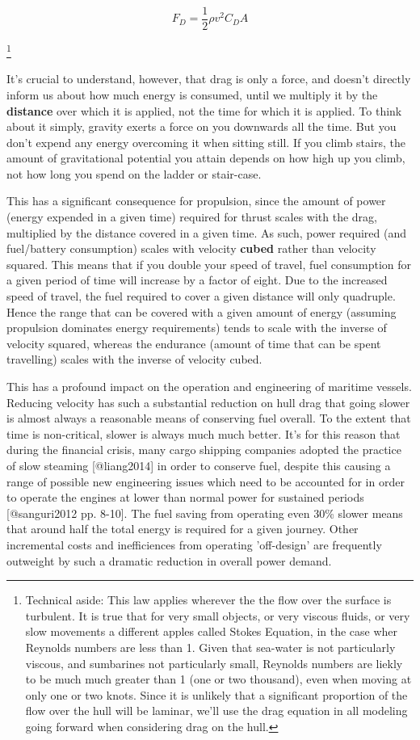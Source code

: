 \documentclass{article}\usepackage[]{graphicx}\usepackage[]{color}
\begin{document}
\begin{equation}
\label{eq:1}
F_D = \frac{1}{2}\rho v^2C_DA
\end{equation}

\footnote{Technical aside: This law applies wherever the the flow over the surface is turbulent. It is true that for very small objects, or very viscous fluids, or very slow movements a different apples called Stokes Equation, in the case wher Reynolds numbers are less than 1.  Given that sea-water is not particularly viscous, and sumbarines not particularly small, Reynolds numbers are liekly to be much much greater than 1 (one or two thousand), even when moving at only one or two knots.  Since it is unlikely that a significant proportion of the flow over the hull will be laminar, we'll use the drag equation in all modeling going forward when considering drag on the hull.}


It's crucial to understand, however, that drag is only a force, and doesn't directly inform us about how much energy is consumed, until we multiply it by the \textbf{distance} over which it is applied, not the time for which it is applied.  To think about it simply, gravity exerts a force on you downwards all the time.  But you don't expend any energy overcoming it when sitting still.  If you climb stairs, the amount of gravitational potential you attain depends on how high up you climb, not how long you spend on the ladder or stair-case.

This has a significant consequence for propulsion, since the amount of power (energy expended in a given time) required for thrust scales with the drag, multiplied by the distance covered in a given time.  As such, power required (and fuel/battery consumption) scales with velocity \textbf{cubed} rather than velocity squared.  This means that if you double your speed of travel, fuel consumption for a given period of time will increase by a factor of eight.  Due to the increased speed of travel, the fuel required to cover a given distance will only quadruple.  Hence the range that can be covered with a given amount of energy (assuming propulsion dominates energy requirements) tends to scale with the inverse of velocity squared, whereas the endurance (amount of time that can be spent travelling) scales with the inverse of velocity cubed.

This has a profound impact on the operation and engineering of maritime vessels.  Reducing velocity has such a substantial reduction on hull drag that going slower is almost always a reasonable means of conserving fuel overall.  To the extent that time is non-critical, slower is always much much better.  It's for this reason that during the financial crisis, many cargo shipping companies adopted the practice of slow steaming [@liang2014] in order to conserve fuel, despite this causing a range of possible new engineering issues which need to be accounted for in order to operate the engines at lower than normal power for sustained periods [@sanguri2012 pp. 8-10]. The fuel saving from operating even 30\% slower means that around half the total energy is required for a given journey.  Other incremental costs and inefficiences from operating 'off-design' are frequently outweight by such a dramatic reduction in overall power demand.
\end{document}
